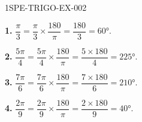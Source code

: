 \begin{corrige}{1SPE-TRIGO-EX-002}


\textbf{1.} $\dfrac{\pi}{3} = \dfrac{\pi}{3} \times \dfrac{180}{\pi} = \dfrac{180}{3} = 60°$.

\textbf{2.} $\dfrac{5\pi}{4} = \dfrac{5\pi}{4} \times \dfrac{180}{\pi} = \dfrac{5 \times 180}{4} = 225°$.

\textbf{3.} $\dfrac{7\pi}{6} = \dfrac{7\pi}{6} \times \dfrac{180}{\pi} = \dfrac{7 \times 180}{6} = 210°$.

\textbf{4.} $\dfrac{2\pi}{9} = \dfrac{2\pi}{9} \times \dfrac{180}{\pi} = \dfrac{2 \times 180}{9} = 40°$.

\end{corrige}
